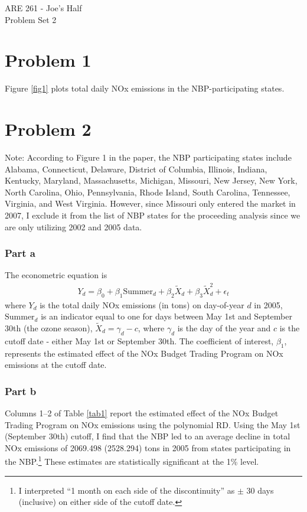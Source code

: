 \documentclass[12pt]{article}
\begin{document}
\begin{center}
ARE 261 - Joe's Half \\
Problem Set 2
\end{center}

\section*{Problem 1}
Figure \ref{fig1} plots total daily NOx emissions in the NBP-participating states.

\section*{Problem 2}
Note: According to Figure 1 in the paper, the NBP participating states include Alabama, Connecticut, Delaware, District of Columbia, Illinois, Indiana, Kentucky, Maryland, Massachusetts, Michigan, Missouri, New Jersey, New York, North Carolina, Ohio, Pennsylvania, Rhode Island, South Carolina, Tennessee, Virginia, and West Virginia. However, since Missouri only entered the market in 2007, I exclude it from the list of NBP states for the proceeding analysis since we are only utilizing 2002 and 2005 data.

\subsubsection*{Part a}
The econometric equation is
\begin{align}
	Y_d = \beta_0 + \beta_1 \text{Summer}_d + \beta_2 \tilde{X}_d + \beta_3 \tilde{X}_d^2 + \epsilon_t
\end{align}
where $Y_d$ is the total daily NOx emissions (in tons) on day-of-year $d$ in 2005, $\text{Summer}_d$ is an indicator equal to one for days between May 1st and September 30th (the ozone season), $\tilde{X}_d = \gamma_d - c$, where $\gamma_d$ is the day of the year and $c$ is the cutoff date - either May 1st or September 30th. The coefficient of interest, $\beta_1$, represents the estimated effect of the NOx Budget Trading Program on NOx emissions at the cutoff date.

\subsubsection*{Part b}
Columns 1--2 of Table \ref{tab1} report the estimated effect of the NOx Budget Trading Program on NOx emissions using the polynomial RD. Using the May 1st (September 30th) cutoff, I find that the NBP led to an average decline in total NOx emissions of 2069.498 (2528.294) tons in 2005 from states participating in the NBP.\footnote{I interpreted ``1 month on each side of the discontinuity'' as $\pm$ 30 days (inclusive) on either side of the cutoff date.} These estimates are statistically significant at the 1\% level.
\end{document}
